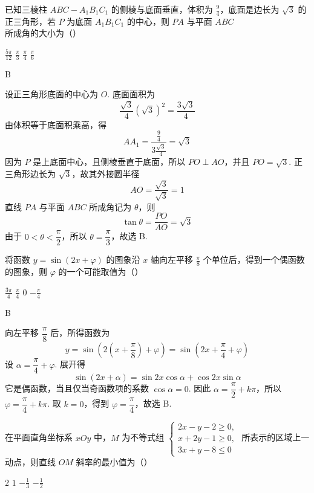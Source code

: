 \begin{problem}
已知三棱柱 \(ABC - A_{1}B_{1}C_{1}\) 的侧棱与底面垂直，体积为 \(\frac{9}{4}\)，底面是边长为 \(\sqrt{3}\) 的正三角形，若 \(P\) 为底面 \(A_{1}B_{1}C_{1}\) 的中心，则 \(PA\) 与平面 \(ABC\) 所成角的大小为（\quad）

\choices
    {\(\frac{5\pi}{12}\)}
    {\(\frac{\pi}{3}\)}
    {\(\frac{\pi}{4}\)}
    {\(\frac{\pi}{6}\)}
\end{problem}

\begin{answer}
B
\end{answer}

\begin{solution}
设正三角形底面的中心为 \(O\). 底面面积为
\[
\frac{\sqrt{3}}{4}(\sqrt{3})^2=\frac{3\sqrt{3}}{4}
\]
由体积等于底面积乘高，得
\[
AA_{1}=\frac{\frac{9}{4}}{3\frac{\sqrt{3}}{4}}=\sqrt{3}
\]
因为 \(P\) 是上底面中心，且侧棱垂直于底面，所以 \(PO\perp AO\)，并且 \(PO=\sqrt{3}\). 正三角形边长为 \(\sqrt{3}\)，故其外接圆半径
\[
AO=\frac{\sqrt{3}}{\sqrt{3}}=1
\]
直线 \(PA\) 与平面 \(ABC\) 所成角记为 \(\theta\)，则
\[
\tan\theta=\frac{PO}{AO}=\sqrt{3}
\]
由于 \(0<\theta<\dfrac{\pi}{2}\)，所以 \(\theta=\dfrac{\pi}{3}\)，故选 B.
\end{solution}

\begin{problem}
将函数 \(y = \sin (2x + \varphi)\) 的图象沿 \(x\) 轴向左平移 \(\frac{\pi}{8}\) 个单位后，得到一个偶函数的图象，则 \(\varphi\) 的一个可能取值为（\quad）

\choices
    {\(\frac{3\pi}{4}\)}
    {\(\frac{\pi}{4}\)}
    {\(0\)}
    {\(-\frac{\pi}{4}\)}
\end{problem}

\begin{answer}
B
\end{answer}

\begin{solution}
向左平移 \(\dfrac{\pi}{8}\) 后，所得函数为
\[
y=\sin\left(2\left(x+\frac{\pi}{8}\right)+\varphi\right)=\sin\left(2x+\frac{\pi}{4}+\varphi\right)
\]
设 \(\alpha=\dfrac{\pi}{4}+\varphi\). 展开得
\[
\sin(2x+\alpha)=\sin 2x\cos\alpha+\cos 2x\sin\alpha
\]
它是偶函数，当且仅当奇函数项的系数 \(\cos\alpha=0\). 因此
\(\alpha=\dfrac{\pi}{2}+k\pi\)，所以 \(\varphi=\dfrac{\pi}{4}+k\pi\).
取 \(k=0\)，得到 \(\varphi=\dfrac{\pi}{4}\)，故选 B.
\end{solution}

\begin{problem}
在平面直角坐标系 \(xOy\) 中，\(M\) 为不等式组
\(\begin{cases}
2x - y - 2 \geqslant 0,\\
x + 2y - 1 \geqslant 0,\\
3x + y - 8 \leqslant 0
\end{cases}\)
所表示的区域上一动点，则直线 \(OM\) 斜率的最小值为（\quad）

\choices
    {\(2\)}
    {\(1\)}
    {\(-\frac{1}{3}\)}
    {\(-\frac{1}{2}\)}
\end{problem}

